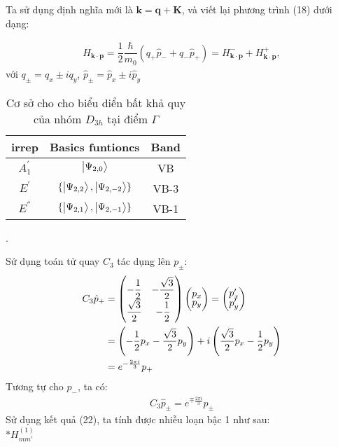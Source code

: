 \documentclass{report}
\newcommand{\f}[2]{\dfrac{#1}{#2}}
\begin{document}
Ta sử dụng định nghĩa mới là $\mathbf{k = q + K}$, và viết lại phương trình (18) dưới dạng:

\begin{align}
	H_{\mathbf{k\cdot p}} = \f{1}{2} \f{\hbar}{m_0} ( q_{+} \hat{p}_{-} + q_{-} \hat{p}_{+}) = H_{\mathbf{k\cdot p}}^{-} + H_{\mathbf{k\cdot p}}^{+},
\end{align}
với $q_{\pm} = q_{x} \pm i q_y $, $\hat{p}_{\pm} = \hat{p}_{x} \pm i \hat{p}_y $

\begin{table}[h!]
	\centering
	\begin{tabular}{c  c  c}
		\hline
		\hline
		irrep       & Basics funtioncs                           & Band \\ [0.6ex]
		\hline
		$A_{1}^{'}$ & $\ket{\Psi_{2,0}}$                         & VB   \\
		$E_{}^{'}$  & $\{ \ket{\Psi_{2,2}},\ket{\Psi_{2,-2}} \}$ & VB-3 \\
		$E_{}^{''}$ & $\{ \ket{\Psi_{2,1}},\ket{\Psi_{2,-1}} \}$ & VB-1 \\
		\hline
	\end{tabular}
	\caption{Cơ sở cho cho biểu diển bất khả quy của nhóm $D_{3h}$ tại điểm $\Gamma$}.
\end{table}

Sử dụng toán tử quay $C_3$ tác dụng lên $p_\pm$:
\begin{align*}
	\renewcommand{\arraystretch}{0.75}
	C_{3} \hat{p}_{+} & =
	\begin{pmatrix}
		-\f{1}{2}       & -\f{\sqrt{3}}{2} \\
		\f{\sqrt{3}}{2} & -\f{1}{2}        \\
	\end{pmatrix}
	\begin{pmatrix}
		p_x \\
		p_y
	\end{pmatrix}
	= \begin{pmatrix}
		  p'_x \\
		  p'_y
	  \end{pmatrix}                                                                                                             \\
	                  & = \left( -\f{1}{2} p_x - \f{\sqrt{3}}{2} p_y \right) + i \left( \f{\sqrt{3}}{2}p_x - \f{1}{2}p_y \right) \\
	                  & = e^{-\frac{2\pi i}{3}} p_{+}
\end{align*}
Tương tự cho $p_{-}$, ta có:
\begin{align}
	C_{3} \hat{p}_{\pm} = e^{\mp\frac{2\pi i}{3}} p_{\pm}
\end{align}
Sử dụng kết quả (22), ta tính được nhiễu loạn bậc 1 như sau:\\
$\ast H^{(1)}_{mm'}$
\end{document}
